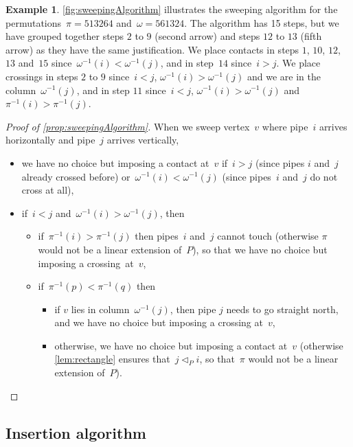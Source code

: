 \documentclass{amsart}
\theoremstyle{definition}
\newtheorem{example}[theorem]{Example}
\newcommand{\less}{\vartriangleleft} %
\newcommand{\contactLess}[1]{\less_{#1}} %
\begin{document}
\begin{example}
\label{exm:sweepingAlgorithm}
\cref{fig:sweepingAlgorithm} illustrates the sweeping algorithm for the permutations~${\pi = 513264}$ and~${\omega = 561324}$.
The algorithm has 15 steps, but we have grouped together steps $2$ to $9$ (second arrow) and steps $12$ to $13$ (fifth arrow) as they have the same justification.
We place contacts in steps $1$, $10$, $12$, $13$ and~$15$ since~$\omega^{-1}(i) < \omega^{-1}(j)$, and in step~$14$ since~$i > j$.
We place crossings in steps $2$ to $9$ since~$i < j$, $\omega^{-1}(i) > \omega^{-1}(j)$ and we are in the column~$\omega^{-1}(j)$, and in step $11$ since~$i < j$, $\omega^{-1}(i) > \omega^{-1}(j)$ and~$\pi^{-1}(i) > \pi^{-1}(j)$.
\end{example}

\begin{proof}[Proof of \cref{prop:sweepingAlgorithm}]
When we sweep vertex~$v$ where pipe~$i$ arrives horizontally and pipe~$j$ arrives vertically,
\begin{itemize}
\item we have no choice but imposing a contact at~$v$ if~$i > j$ (since pipes $i$ and~$j$ already crossed before) or~$\omega^{-1}(i) < \omega^{-1}(j)$ (since pipes~$i$ and~$j$ do not cross at all),
\item if~$i < j$ and~$\omega^{-1}(i) > \omega^{-1}(j)$, then
\begin{itemize}
\item if~$\pi^{-1}(i) > \pi^{-1}(j)$ then pipes~$i$ and~$j$ cannot touch (otherwise $\pi$ would not be a linear extension of~$P$), so that we have no choice but imposing a crossing~at~$v$,
\item if~$\pi^{-1}(p) < \pi^{-1}(q)$ then
	\begin{itemize}
	\item if $v$ lies in column~$\omega^{-1}(j)$, then pipe $j$ needs to go straight north, and we have no choice but imposing a crossing at~$v$,
	\item otherwise, we have no choice but imposing a contact at~$v$ (otherwise \cref{lem:rectangle} ensures that~$j \contactLess{P} i$, so that~$\pi$ would not be a linear extension of~$P$).
	\qedhere
	\end{itemize}
\end{itemize}
\end{itemize}
\end{proof}


\subsection{Insertion algorithm}
\label{subsec:insertionAlgorithm}
\end{document}
